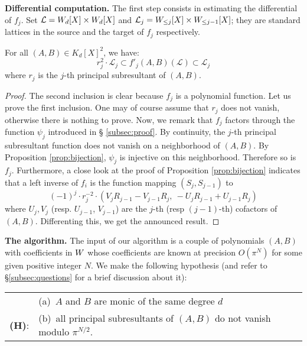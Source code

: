 \documentclass{article}
\begin{document}
\noindent
{\bf Differential computation.}
The first step consists in estimating the differential of $f_j$. 
Set $\mathcal L = W_d[X] \times W_d[X]$ and $\mathcal L_j = 
W_{\leq j}[X] \times W_{\leq j-1}[X]$; they are standard lattices
in the source and the target of $f_j$ respectively.

\begin{lem}
\label{lem:diff}
For all $(A,B) \in K_d[X]^2$, we have:
$$r_j^2 \cdot \mathcal L_j 
\subset f'_j(A,B)(\mathcal L) \subset \mathcal L_j$$
where $r_j$ is the $j$-th principal subresultant of $(A,B)$.
\end{lem}

\begin{proof}
The second inclusion is clear because $f_j$ is a polynomial function. 
Let us prove the first inclusion. One may of course assume that $r_j$ 
does not vanish, otherwise there is nothing to prove. Now, we remark 
that $f_j$ factors through the function $\psi_j$ introduced in \S 
\ref{subsec:proof}. By continuity, the $j$-th principal subresultant 
function does not vanish on a neighborhood of $(A,B)$. By Proposition 
\ref{prop:bijection}, $\psi_j$ is injective on this neighborhood. 
Therefore so is $f_j$. Furthermore, a close look at the proof of 
Proposition \ref{prop:bijection} indicates that a left inverse of $f_i$ 
is the function mapping $(S_j, S_{j-1})$ to
$$(-1)^j \cdot r_j^{-2} \cdot 
(V_j R_{j-1}{-}V_{j-1} R_j,\: -U_j R_{j-1}{+}U_{j-1} R_j)$$
where $U_j, V_j$ (resp. $U_{j-1}$, $V_{j-1}$) are the $j$-th (resp 
$(j-1)$-th) cofactors of $(A,B)$. Differenting this, we get the
announced result.
\end{proof}

\noindent
{\bf The algorithm.}
The input of our algorithm is a couple of polynomials $(A,B)$ with 
coefficients in $W$ whose coefficients are known at precision 
$O(\pi^N)$ for some given positive integer $N$. We make the following 
hypothesis (and refer to \S \ref{subsec:questions} for a brief 
discussion about it):

\medskip

\begin{tabular}{rl}
& (a)~$A$ and $B$ are monic of the same degree $d$ \\
{\bf (H)}: & (b)~all principal subresultants of $(A,B)$ 
do not vanish modulo $\pi^{N/2}$.
\end{tabular}

\medskip
\end{document}
